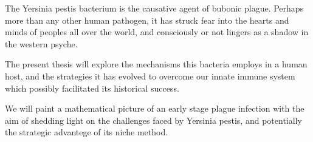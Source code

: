 
The Yersinia pestis bacterium is the causative agent of bubonic plague. Perhaps more than any other human pathogen, it has struck fear into the hearts and minds of peoples all over the world, and consciously or not lingers as a shadow in the western psyche. 

The present thesis will explore the mechanisms this bacteria employs in a human host, and the strategies it has evolved to overcome our innate immune system which possibly facilitated its historical success. 

We will paint a mathematical picture of an early stage plague infection with the aim of shedding light on the challenges faced by Yersinia pestis, and potentially the strategic advantege of its niche method.
